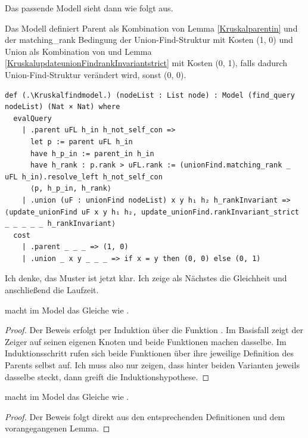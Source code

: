 Das passende Modell sieht dann wie folgt aus.

\begin{definition}[\Kruskalfindmodel]
  Das Modell definiert Parent als Kombination von \Kruskalparent Lemma \ref{Kruskalparentin} und der matching\_rank Bedingung der Union-Find-Struktur mit Kosten (1, 0)
  und Union als Kombination von \KruskalupdateunionFind und Lemma \ref{KruskalupdateunionFindrankInvariantstrict} mit Kosten (0, 1), falls dadurch Union-Find-Struktur verändert wird, sonst (0, 0).
\end{definition}
\begin{lstlisting}
def (.\Kruskalfindmodel.) (nodeList : List node) : Model (find_query nodeList) (Nat × Nat) where
  evalQuery
    | .parent uFL h_in h_not_self_con =>
      let p := parent uFL h_in
      have h_p_in := parent_in h_in
      have h_rank : p.rank > uFL.rank := (unionFind.matching_rank _ uFL h_in).resolve_left h_not_self_con
      ⟨p, h_p_in, h_rank⟩
    | .union (uF : unionFind nodeList) x y h₁ h₂ h_rankInvariant => ⟨update_unionFind uF x y h₁ h₂, update_unionFind.rankInvariant_strict _ _ _ _ _ h_rankInvariant⟩
  cost
    | .parent _ _ _ => (1, 0)
    | .union _ x y _ _ _ => if x = y then (0, 0) else (0, 1)
\end{lstlisting}

Ich denke, das Muster ist jetzt klar.
Ich zeige als Nächstes die Gleichheit und anschließend die Laufzeit.

\begin{lemma}[\KruskalconnectedcomponentofunionFindofunionFindLinkprogeval]
  \KruskalconnectedcomponentofunionFindofunionFindLinkprog macht im Model \Kruskalfindmodel das Gleiche wie \KruskalconnectedcomponentofunionFindofunionFindLink.
\end{lemma}
\begin{proof}
  Der Beweis erfolgt per Induktion über die Funktion \KruskalconnectedcomponentofunionFindofunionFindLink.
  Im Basisfall zeigt der Zeiger auf seinen eigenen Knoten und beide Funktionen machen dasselbe.
  Im Induktionsschritt rufen sich beide Funktionen über ihre jeweilige Definition des Parents selbst auf.
  Ich muss also nur zeigen, dass hinter beiden Varianten jeweils dasselbe steckt, dann greift die Induktionshypothese.
\end{proof}

\begin{lemma}[\KruskalconnectedcomponentofunionFindofidprogeval]\label{KruskalconnectedcomponentofunionFindofidprogeval}
  \KruskalconnectedcomponentofunionFindofidprog macht im Model \Kruskalfindmodel das Gleiche wie \KruskalconnectedcomponentofunionFindofid.
\end{lemma}
\begin{proof}
  Der Beweis folgt direkt aus den entsprechenden Definitionen und dem vorangegangenen Lemma.
\end{proof}

